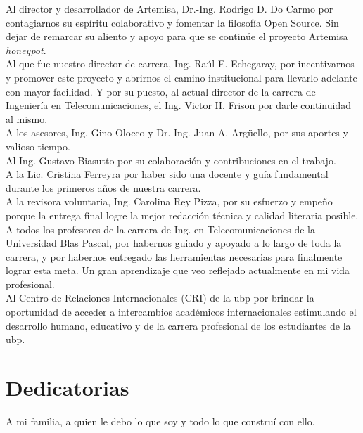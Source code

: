 \documentclass[a4paper,12pt]{report}
\begin{document}
Al director y desarrollador de Artemisa, Dr.-Ing. Rodrigo D. Do Carmo por contagiarnos su espíritu 
colaborativo y fomentar la filosofía Open Source. Sin dejar de remarcar su aliento y apoyo para 
que se continúe el proyecto Artemisa \emph{honeypot}.\\

Al que fue nuestro director de carrera, Ing. Raúl E. Echegaray, por incentivarnos y promover
este proyecto y abrirnos el camino institucional para llevarlo adelante con mayor facilidad. 
Y por su puesto, al actual director de la carrera de Ingeniería en Telecomunicaciones,
el Ing. \mbox{Victor} H. Frison por darle continuidad al mismo.\\

A los asesores, Ing. Gino Olocco y Dr. Ing. Juan A. Argüello, por sus aportes y valioso tiempo.\\

Al Ing. Gustavo Biasutto por su colaboración y contribuciones en el trabajo.\\

A la Lic. Cristina Ferreyra por haber sido una docente y guía fundamental durante los primeros
años de nuestra carrera.\\ 

A la revisora voluntaria, Ing. Carolina Rey Pizza, por su esfuerzo y empeño porque la entrega final logre 
la mejor redacción técnica y calidad literaria posible.\\

A todos los profesores de la carrera de Ing. en Telecomunicaciones de la Universidad Blas Pascal,
por habernos guiado y apoyado a lo largo de toda la carrera, y por habernos
entregado las herramientas necesarias para finalmente lograr esta meta. Un gran aprendizaje que
veo reflejado actualmente en mi vida profesional.\\

Al Centro de Relaciones Internacionales (CRI) de la \ac{ubp} por brindar la oportunidad de
acceder a intercambios académicos internacionales estimulando el desarrollo humano, educativo
y de la carrera profesional de los estudiantes de la \ac{ubp}.

\thispagestyle{empty}
\newpage

\chapter*{Dedicatorias}

A mi familia, a quien le debo lo que soy y todo lo que construí con ello.\\
\end{document}
